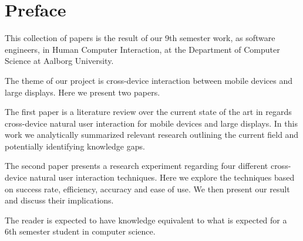 \section*{Preface}
This collection of papers is the result of our 9th semester work, as software engineers, in Human Computer Interaction, at the Department of Computer Science at Aalborg University.

The theme of our project is cross-device interaction between mobile devices and large displays. Here we present two papers. 

The first paper is a literature review over the current state of the art in regards cross-device natural user interaction for mobile devices and large displays. In this work we analytically summarized relevant research outlining the current field and potentially identifying knowledge gaps. 

The second paper presents a research experiment regarding four different cross-device natural user interaction techniques. Here we explore the techniques based on success rate, efficiency, accuracy and ease of use. We then present our result and discuss their implications.

The reader is expected to have knowledge equivalent to what is expected for a 6th semester student in computer science.

